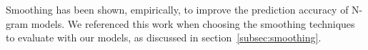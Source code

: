 \documentclass[ai15_group61_report.tex]{subfiles}
\begin{document}

Smoothing has been shown, empirically, to improve the prediction accuracy of N-gram models\cite{chen-smoothing}. We referenced this work when choosing the smoothing techniques to evaluate with our models, as discussed in section~\ref{subsec:smoothing}.

\end{document}
